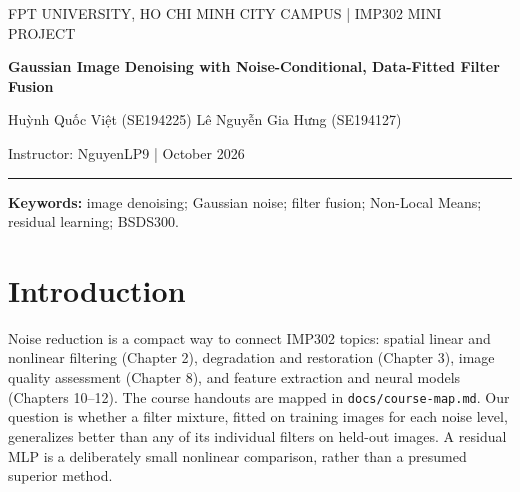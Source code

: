 \documentclass[11pt,a4paper]{article}
\begin{document}
\begin{center}
{\small FPT UNIVERSITY, HO CHI MINH CITY CAMPUS \quad | \quad IMP302 MINI PROJECT\par}
\vspace{0.55em}
{\LARGE\bfseries Gaussian Image Denoising with Noise-Conditional, Data-Fitted Filter Fusion\par}
\vspace{0.55em}
{\normalsize Huỳnh Quốc Việt (SE194225) \qquad Lê Nguyễn Gia Hưng (SE194127)\par}
{\small Instructor: NguyenLP9 \quad |  October 2026\par}
\vspace{0.45em}\hrule
\end{center}

\begin{abstract}
This study investigates Gaussian denoising of grayscale natural images from the Berkeley Segmentation Dataset (BSDS300). Gaussian smoothing, bilateral filtering, and Non-Local Means (NLM) provide interpretable baselines. The main method fits a nonnegative, sum-to-one combination of their outputs separately for three noise levels; a small residual multilayer perceptron (MLP) tests whether pixelwise nonlinear correction adds value. Sixty images fit weights, 12 select NLM and MLP settings, 20 pilot images informed development, and a separate 20-image set supplies the final results. At noise standard deviations 15, 25, and 50, fusion achieves mean PSNRs of 29.18, 26.72, and 23.61 dB. Its paired gains over the strongest individual PSNR baseline, bilateral filtering, are 0.37, 0.37, and 0.49 dB; the residual MLP does not improve on fusion. We provide image-level scores, paired bootstrap intervals, executable EDA notebooks, a local web demonstration, and reproducibility records. Conclusions are limited to the fixed grayscale subset and synthetic noise protocol.
\end{abstract}
\textbf{Keywords:} image denoising; Gaussian noise; filter fusion; Non-Local Means; residual learning; BSDS300.

\section{Introduction}
Noise reduction is a compact way to connect IMP302 topics: spatial linear and nonlinear filtering (Chapter 2), degradation and restoration (Chapter 3), image quality assessment (Chapter 8), and feature extraction and neural models (Chapters 10--12). The course handouts are mapped in \texttt{docs/course-map.md}. Our question is whether a filter mixture, fitted on training images for each noise level, generalizes better than any of its individual filters on held-out images. A residual MLP is a deliberately small nonlinear comparison, rather than a presumed superior method.
\end{document}
